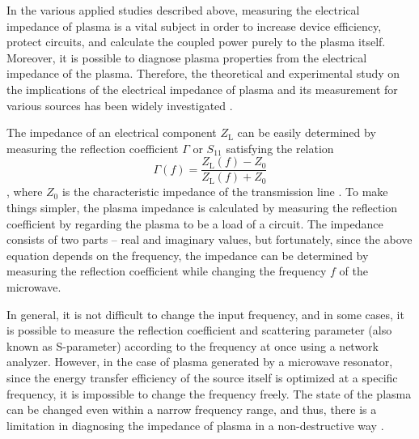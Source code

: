 In the various applied studies described above, measuring the electrical impedance of plasma is a vital subject in order to increase device efficiency, protect circuits, and calculate the coupled power purely to the plasma itself. Moreover, it is possible to diagnose plasma properties from the electrical impedance of the plasma. Therefore, the theoretical and experimental study on the implications of the electrical impedance of plasma and its measurement for various sources has been widely investigated \cite{lieberman2005principles, blackwell2005measurement, iza2005split, choi2009microwave, mckay2010excitation}.

The impedance of an electrical component $Z_\text{L}$ can be easily determined by measuring the reflection coefficient $\Gamma$ or  $S_\text{11}$ satisfying the relation
\begin{equation}
\Gamma \left( f \right) = \frac{Z_\text{L} \left( f \right) - Z_0}{Z_\text{L} \left( f \right) + Z_0}
\end{equation}
, where $Z_0$ is the characteristic impedance of the transmission line \cite{pozar2011microwave}. To make things simpler, the plasma impedance is calculated by measuring the reflection coefficient by regarding the plasma to be a load of a circuit. The impedance consists of two parts -- real and imaginary values, but fortunately, since the above equation depends on the frequency, the impedance can be determined by measuring the reflection coefficient while changing the frequency $f$ of the microwave.

In general, it is not difficult to change the input frequency, and in some cases, it is possible to measure the reflection coefficient and scattering parameter (also known as S-parameter) according to the frequency at once using a network analyzer. However, in the case of plasma generated by a microwave resonator, since the energy transfer efficiency of the source itself is optimized at a specific frequency, it is impossible to change the frequency freely. The state of the plasma can be changed even within a narrow frequency range, and thus, there is a limitation in diagnosing the impedance of plasma in a non-destructive way \cite{iza2005split, choi2009microwave, park2010inactivation, kang2011slit, lee2015self}.

